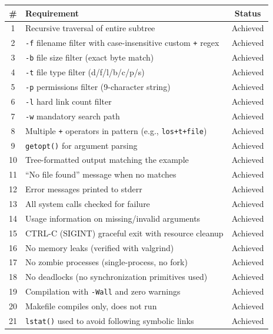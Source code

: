 \documentclass[12pt,a4paper]{article}
\begin{document}
\begin{table}[h!]
\centering
\begin{tabular}{@{}clc@{}}
\toprule
\textbf{\#} & \textbf{Requirement} & \textbf{Status} \\
\midrule
1  & Recursive traversal of entire subtree & Achieved \\
2  & \texttt{-f} filename filter with case-insensitive custom \texttt{+} regex & Achieved \\
3  & \texttt{-b} file size filter (exact byte match) & Achieved \\
4  & \texttt{-t} file type filter (d/f/l/b/c/p/s) & Achieved \\
5  & \texttt{-p} permissions filter (9-character string) & Achieved \\
6  & \texttt{-l} hard link count filter & Achieved \\
7  & \texttt{-w} mandatory search path & Achieved \\
8  & Multiple \texttt{+} operators in pattern (e.g., \texttt{los+t+file}) & Achieved \\
9  & \texttt{getopt()} for argument parsing & Achieved \\
10 & Tree-formatted output matching the example & Achieved \\
11 & ``No file found'' message when no matches & Achieved \\
12 & Error messages printed to stderr & Achieved \\
13 & All system calls checked for failure & Achieved \\
14 & Usage information on missing/invalid arguments & Achieved \\
15 & CTRL-C (SIGINT) graceful exit with resource cleanup & Achieved \\
16 & No memory leaks (verified with valgrind) & Achieved \\
17 & No zombie processes (single-process, no fork) & Achieved \\
18 & No deadlocks (no synchronization primitives used) & Achieved \\
19 & Compilation with \texttt{-Wall} and zero warnings & Achieved \\
20 & Makefile compiles only, does not run & Achieved \\
21 & \texttt{lstat()} used to avoid following symbolic links & Achieved \\
\bottomrule
\end{tabular}
\end{table}
\end{document}
